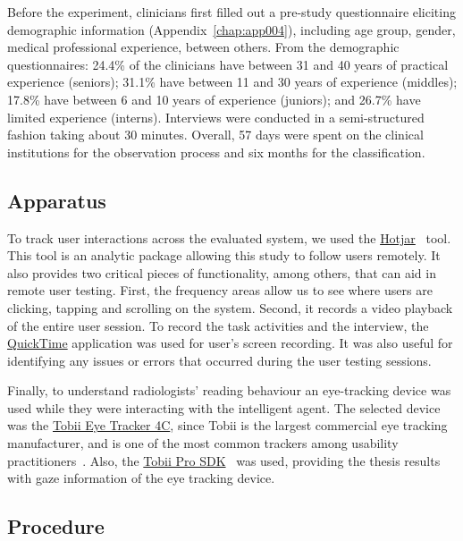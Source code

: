 Before the experiment, clinicians first filled out a pre-study questionnaire eliciting demographic information (Appendix~\ref{chap:app004}), including age group, gender, medical professional experience, between others.
From the demographic questionnaires:
24.4\% of the clinicians have between 31 and 40 years of practical experience (seniors);
31.1\% have between 11 and 30 years of experience (middles);
17.8\% have between 6 and 10 years of experience (juniors); and
26.7\% have limited experience (interns).
Interviews were conducted in a semi-structured fashion taking about 30 minutes.
Overall, 57 days were spent on the clinical institutions for the observation process and six months for the classification.

\subsection{Apparatus}
\label{sec:app002005002}

To track user interactions across the evaluated system, we used the \hyperlink{https://www.hotjar.com/}{Hotjar}~\cite{liikkanen2017data} tool.
This tool is an analytic package allowing this study to follow users remotely.
It also provides two critical pieces of functionality, among others, that can aid in remote user testing.
First, the frequency areas allow us to see where users are clicking, tapping and scrolling on the system.
Second, it records a video playback of the entire user session.
To record the task activities and the interview, the \hyperlink{https://support.apple.com/downloads/quicktime}{QuickTime} application was used for user's screen recording.
It was also useful for identifying any issues or errors that occurred during the user testing sessions.

Finally, to understand radiologists' reading behaviour an eye-tracking device was used while they were interacting with the intelligent agent.
The selected device was the \hyperlink{https://gaming.tobii.com/product/tobii-eye-tracker-4c/}{Tobii Eye Tracker 4C}, since Tobii is the largest commercial eye tracking manufacturer, and is one of the most common trackers among usability practitioners~\cite{sidenko2018eye}.
Also, the \hyperlink{https://www.tobiipro.com/product-listing/tobii-pro-sdk/}{Tobii Pro SDK}~\cite{chatelain2018evaluation} was used, providing the thesis results with gaze information of the eye tracking device.

\subsection{Procedure}
\label{sec:chap005005003}


